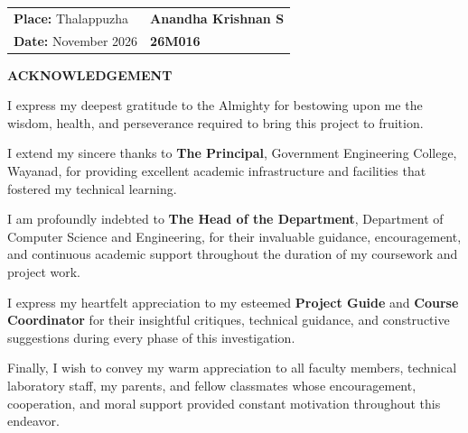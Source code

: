 \documentclass[12pt,a4paper,oneside,openany]{report}
\begin{document}
\noindent
\begin{tabular*}{\textwidth}{@{\extracolsep{\fill}}ll}
    \textbf{Place:} Thalappuzha & \textbf{Anandha Krishnan S} \\
    \textbf{Date:} November 2026 & \textbf{26M016}
\end{tabular*}

\vfill

\clearpage
\thispagestyle{plain}
\begin{center}
    \textbf{\Large ACKNOWLEDGEMENT}\\[1.0cm]
\end{center}

\hspace*{0.5in}I express my deepest gratitude to the Almighty for bestowing upon me the wisdom, health, and perseverance required to bring this project to fruition.

\vspace{0.3cm}
\hspace*{0.5in}I extend my sincere thanks to \textbf{The Principal}, Government Engineering College, Wayanad, for providing excellent academic infrastructure and facilities that fostered my technical learning.

\vspace{0.3cm}
\hspace*{0.5in}I am profoundly indebted to \textbf{The Head of the Department}, Department of Computer Science and Engineering, for their invaluable guidance, encouragement, and continuous academic support throughout the duration of my coursework and project work.

\vspace{0.3cm}
\hspace*{0.5in}I express my heartfelt appreciation to my esteemed \textbf{Project Guide} and \textbf{Course Coordinator} for their insightful critiques, technical guidance, and constructive suggestions during every phase of this investigation.

\vspace{0.3cm}
\hspace*{0.5in}Finally, I wish to convey my warm appreciation to all faculty members, technical laboratory staff, my parents, and fellow classmates whose encouragement, cooperation, and moral support provided constant motivation throughout this endeavor.\\[1.5cm]
\end{document}
